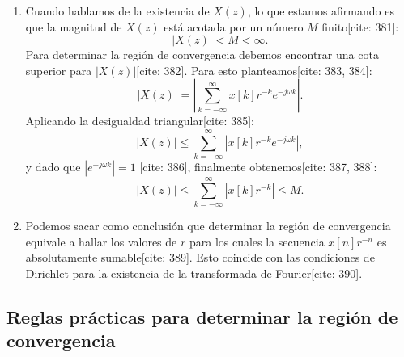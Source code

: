 \begin{enumerate}
	\item Cuando hablamos de la existencia de $X(z)$, lo que estamos afirmando es que la magnitud de $X(z)$ est\'{a} acotada por un n\'{u}mero $M$ finito[cite: 381]:
	\begin{equation}
		|X(z)| < M < \infty.
	\end{equation}
	Para determinar la regi\'{o}n de convergencia debemos encontrar una cota superior para $|X(z)|$[cite: 382]. Para esto planteamos[cite: 383, 384]:
	\begin{equation}
		|X(z)| = \left| \sum_{k=-\infty}^{\infty} x[k] r^{-k} e^{-j \omega k} \right|.
	\end{equation}
	Aplicando la desigualdad triangular[cite: 385]:
	\begin{equation}
		|X(z)| \leq \sum_{k=-\infty}^{\infty} \left| x[k] r^{-k} e^{-j \omega k} \right|,
	\end{equation}
	y dado que $|e^{-j \omega k}| = 1$ [cite: 386], finalmente obtenemos[cite: 387, 388]:
	\begin{equation}
		|X(z)| \leq \sum_{k=-\infty}^{\infty} \left| x[k] r^{-k} \right| \leq M.
	\end{equation}
	
	\item Podemos sacar como conclusi\'{o}n que determinar la regi\'{o}n de convergencia equivale a hallar los valores de $r$ para los cuales la secuencia $x[n] r^{-n}$ es absolutamente sumable[cite: 389]. Esto coincide con las condiciones de Dirichlet para la existencia de la transformada de Fourier[cite: 390].
\end{enumerate}


\subsection{Reglas pr\'{a}cticas para determinar la regi\'{o}n de convergencia}

